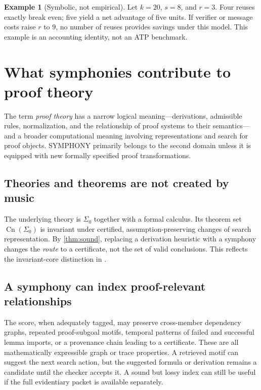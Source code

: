 \documentclass[11pt,letterpaper]{article}
\theoremstyle{definition}
\newtheorem{example}[theorem]{Example}
\theoremstyle{remark}
\newcommand{\Cn}{\operatorname{Cn}}
\begin{document}
\begin{example}[Symbolic, not empirical]
Let $k=20$, $s=8$, and $r=3$. Four reuses exactly break even; five yield a net advantage of five units. If verifier or message costs raise $r$ to $9$, no number of reuses provides savings under this model. This example is an accounting identity, not an ATP benchmark.
\end{example}

\section{What symphonies contribute to proof theory}
The term \emph{proof theory} has a narrow logical meaning---derivations, admissible rules, normalization, and the relationship of proof systems to their semantics---and a broader computational meaning involving representations and search for proof objects. SYMPHONY primarily belongs to the second domain unless it is equipped with new formally specified proof transformations.

\subsection{Theories and theorems are not created by music}
The underlying theory is $\Sigma_0$ together with a formal calculus. Its theorem set $\Cn(\Sigma_0)$ is invariant under certified, assumption-preserving changes of search representation. By \cref{thm:sound}, replacing a derivation heuristic with a symphony changes the \emph{route} to a certificate, not the set of valid conclusions. This reflects the invariant-core distinction in \cite{tenneson-core}.

\subsection{A symphony can index proof-relevant relationships}
The score, when adequately tagged, may preserve cross-member dependency graphs, repeated proof-subgoal motifs, temporal patterns of failed and successful lemma imports, or a provenance chain leading to a certificate. These are all mathematically expressible graph or trace properties. A retrieved motif can suggest the next search action, but the suggested formula or derivation remains a candidate until the checker accepts it. A sound but lossy index can still be useful if the full evidentiary packet is available separately.
\end{document}
